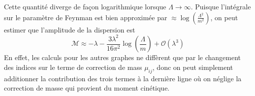 \documentclass{article}
\numberwithin{equation}{section}
\theoremstyle{solution}
\begin{document}
Cette quantité diverge de façon logarithmique lorsque $\Lambda \rightarrow  \infty $. Puisque l'intégrale sur le paramètre de Feynman est bien approximée 
par $\approx \log \left( \frac{\Lambda^{2}}{m^{2}} \right)$, on peut estimer que l'amplitude de la dispersion est
\begin{equation}
        \boxed{\mathcal{M} \approx -\lambda - \frac{3 \lambda^{2}}{16 \pi^{2}} \log \left( \frac{\Lambda}{m} \right) + \mathcal{O}(\lambda^{3})}
\end{equation} 
En effet, les calculs pour les autres graphes ne diffèrent que par le changement des indices sur le terme de correction de mass $\mu_{ij}$, donc on peut simplement 
additionner la contribution des trois termes à la dernière ligne où on néglige la correction de masse qui provient du moment cinétique.





\end{document}
